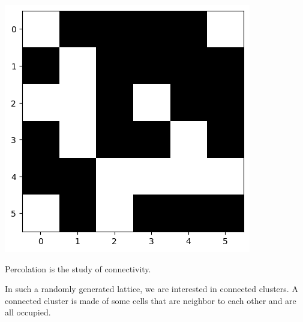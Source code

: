 \documentclass[compress]{beamer}
\newcommand{\imp}[1]{\textcolor{NordRed}{#1}}
\begin{document}
\begin{frame}
\begin{minipage}{.3\linewidth}
    \end{minipage}\hfill%
    \begin{minipage}{.3\linewidth}
        \includegraphics[width=\linewidth]{p3.png}
    \end{minipage}
\end{frame}

\begin{frame}
    \imp{Percolation is the study of connectivity.} 

    \vspace{12pt}

    In such a randomly generated lattice, we are interested in connected clusters.  A
    \imp{connected cluster} is made of some cells that are neighbor to each other and are
    all occupied. 
\end{frame}
\end{document}
